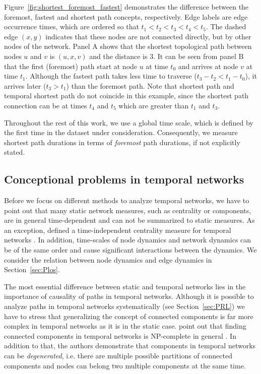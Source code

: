 Figure~\ref{fig:shortest_foremost_fastest} demonstrates the difference between the foremost, fastest and shortest path concepts, respectively.
Edge labels are edge occurrence times, which are ordered so that $t_1<t_2<t_3<t_4<t_5$.
The dashed edge $(x,y)$ indicates that these nodes are not connected directly, but by other nodes of the network.
Panel A shows that the shortest topological path between nodes $u$ and $v$ is $(u,x,v)$ and the distance is $3$.
It can be seen from panel B that the first (foremost) path start at node $u$ at time $t_0$ and arrives at node $v$ at time $t_1$.
Although the fastest path takes less time to traverse ($t_3-t_2<t_1-t_0$), it arrives later ($t_3>t_1$) than the foremost path.
Note that shortest path and temporal shortest path do not coincide in this example, since the shortest path connection can be at times $t_4$ and $t_5$ which are greater than $t_1$ and $t_3$.

Throughout the rest of this work, we use a global time scale, which is defined by the first time in the dataset under consideration.
Consequently, we measure shortest path durations in terms of \emph{foremost} path durations, if not explicitly stated.

\subsection{Conceptional problems in temporal networks}\label{sec:conceptional_problems}
Before we focus on different methods to analyze temporal networks, we have to point out that many static network measures, such as centrality or components, are in general time-dependent and can not be summarized to static measures.
As an exception, \citeauthor{Grindrod:2011fg} defined a time-independent centrality measure for temporal networks \citep{Grindrod:2011fg}. 
In addition, time-scales of node dynamics and network dynamics can be of the same order and cause significant interactions between the dynamics.
We consider the relation between node dynamics and edge dynamics in Section~\ref{sec:Plos}.

The most essential difference between static and temporal networks lies in the importance of causality of paths in temporal networks.
Although it is possible to analyze paths in temporal networks systematically (see Section~\ref{sec:PRL}) we have to stress that generalizing the concept of connected components is far more complex in temporal networks as it is in the static case.
\citeauthor{Nicosia:2012hz} point out that finding connected components in temporal networks is NP-complete in general \citep{Nicosia:2012hz}.
In addition to that, the authors demonstrate that components in temporal networks can be \emph{degenerated}, i.e. there are multiple possible partitions of connected components and nodes can belong two multiple components at the same time.

